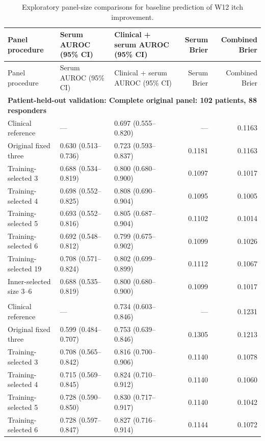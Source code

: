 {\small\setlength{\tabcolsep}{4pt}
\begin{longtable}{p{34mm}p{42mm}p{42mm}rr}
\caption{Exploratory panel-size comparisons for baseline prediction of W12 itch improvement.}\label{tab:itch_panel_size}\\
\toprule Panel procedure & Serum AUROC (95\% CI) & Clinical + serum AUROC (95\% CI) & Serum Brier & Combined Brier \\ \midrule\endfirsthead
\toprule Panel procedure & Serum AUROC (95\% CI) & Clinical + serum AUROC (95\% CI) & Serum Brier & Combined Brier \\ \midrule\endhead
\multicolumn{5}{l}{\textbf{Patient-held-out validation: Complete original panel: 102 patients, 88 responders}} \\
Clinical reference & --- & 0.697 (0.555--0.820) & --- & 0.1163 \\
Original fixed three & 0.630 (0.513--0.736) & 0.723 (0.593--0.837) & 0.1181 & 0.1163 \\
Training-selected 3 & 0.688 (0.534--0.819) & 0.800 (0.680--0.900) & 0.1097 & 0.1017 \\
Training-selected 4 & 0.698 (0.552--0.825) & 0.808 (0.690--0.904) & 0.1095 & 0.1005 \\
Training-selected 5 & 0.693 (0.552--0.816) & 0.805 (0.687--0.904) & 0.1102 & 0.1014 \\
Training-selected 6 & 0.692 (0.548--0.812) & 0.799 (0.675--0.902) & 0.1099 & 0.1026 \\
Training-selected 19 & 0.708 (0.571--0.824) & 0.802 (0.699--0.899) & 0.1112 & 0.1067 \\
Inner-selected size 3--6 & 0.688 (0.535--0.819) & 0.800 (0.680--0.900) & 0.1099 & 0.1017 \\
\addlinespace
\multicolumn{5}{l}{\textbf{Patient-held-out validation: Predictor-imputation sensitivity: 105 patients, 89 responders}} \\
Clinical reference & --- & 0.734 (0.603--0.846) & --- & 0.1231 \\
Original fixed three & 0.599 (0.484--0.707) & 0.753 (0.639--0.846) & 0.1305 & 0.1213 \\
Training-selected 3 & 0.708 (0.565--0.842) & 0.816 (0.700--0.906) & 0.1140 & 0.1078 \\
Training-selected 4 & 0.715 (0.569--0.845) & 0.824 (0.710--0.912) & 0.1140 & 0.1060 \\
Training-selected 5 & 0.728 (0.590--0.850) & 0.830 (0.717--0.917) & 0.1140 & 0.1042 \\
Training-selected 6 & 0.728 (0.597--0.847) & 0.827 (0.716--0.914) & 0.1144 & 0.1072 \\

\end{longtable}}
